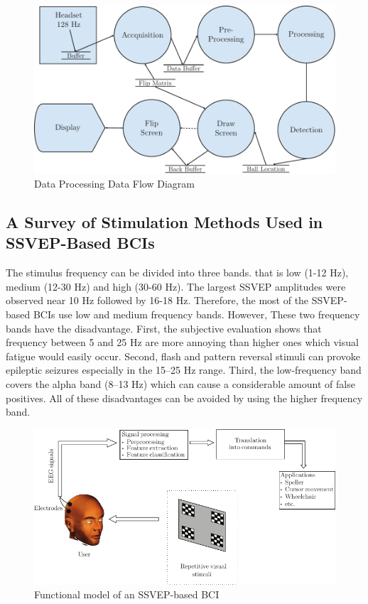 \begin{figure}[h]
	\centering
	\includegraphics[scale = 1.0]{chapter2/29.pdf}
	\caption{ Data Processing Data Flow Diagram}
\end{figure}

\subsection {A Survey of Stimulation Methods Used in SSVEP-Based BCIs\cite{ref7}}

\hspace{1.5cm} The stimulus frequency can be divided into three bands. that is low (1-12 Hz), medium (12-30 Hz) and high (30-60 Hz). The largest SSVEP amplitudes were observed near 10 Hz followed by 16-18 Hz. Therefore, the most of the SSVEP-based BCIs use low and medium frequency bands. However, These two frequency bands have the disadvantage. First, the subjective evaluation shows that frequency between 5 and 25 Hz are more annoying than higher ones which visual fatigue would easily occur. Second, flash and pattern reversal stimuli can provoke epileptic seizures especially in the 15–25 Hz range. Third, the low-frequency band covers the alpha band (8–13 Hz) which can cause a considerable amount of false positives. All of these disadvantages can be avoided by using the higher frequency band.  

\begin{figure}[h]
	\centering
	\includegraphics[scale = 1.0]{chapter2/210.pdf}
	\caption{ Functional model of an SSVEP-based BCI}
\end{figure}  
